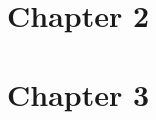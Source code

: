\documentclass[reqno,12pt,oneside]{report}
\theoremstyle{plain}
\theoremstyle{definition}
\theoremstyle{remark}
\numberwithin{theorem}{chapter}
\begin{document}
 \chapter{Chapter 2 }
 \label{chap:chpater2}
 
 
 \chapter{Chapter 3}
 \label{chap:chpater3}
 

 
\startbibliography
 \begin{singlespace} 
 \end{singlespace}
\end{document}
